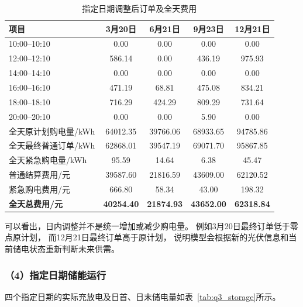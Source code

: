 \begin{table}[htbp]
\centering
\caption{指定日期调整后订单及全天费用}
\label{tab:q3_final_order}
\begin{tabular}{lcccc}
\hline
项目
& 3月20日
& 6月21日
& 9月23日
& 12月21日 \\
\hline
10:00--10:10 & 0.00 & 0.00 & 0.00 & 0.00 \\
12:00--12:10 & 586.14 & 0.00 & 436.19 & 975.93 \\
14:00--14:10 & 0.00 & 0.00 & 0.00 & 0.00 \\
16:00--16:10 & 471.19 & 68.81 & 475.08 & 834.21 \\
18:00--18:10 & 716.29 & 424.29 & 809.29 & 731.64 \\
20:00--20:10 & 0.00 & 0.00 & 5.90 & 0.00 \\
\hline
全天原计划购电量/kWh
& 64012.35 & 39766.06 & 68933.65 & 94785.86 \\

全天最终普通订单/kWh
& 62868.01 & 39547.19 & 69071.70 & 95867.85 \\

全天紧急购电量/kWh
& 95.59 & 14.64 & 6.38 & 45.47 \\

普通结算费用/元
& 39587.60 & 21816.59 & 43609.00 & 62120.52 \\

紧急购电费用/元
& 666.80 & 58.34 & 43.00 & 198.32 \\

\textbf{全天总费用/元}
& \textbf{40254.40}
& \textbf{21874.93}
& \textbf{43652.00}
& \textbf{62318.84} \\
\hline
\end{tabular}
\end{table}

可以看出，日内调整并不是统一增加或减少购电量。
例如3月20日最终订单低于零点原计划，
而12月21日最终订单高于原计划，
说明模型会根据新的光伏信息和当前储电状态重新判断未来供需。


\subsubsection*{（4）指定日期储能运行}

四个指定日期的实际充放电及日首、日末储电量如表~\ref{tab:q3_storage}所示。

